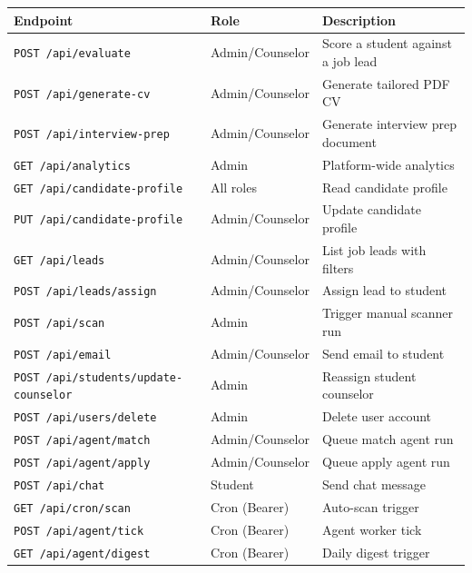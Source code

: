 \documentclass[11pt, a4paper]{article}
\newcommand{\api}[1]{\texttt{\textcolor{accent}{#1}}}
\begin{document}
\begin{longtable}{p{5.5cm}lp{6cm}}
  \toprule
  \textbf{Endpoint} & \textbf{Role} & \textbf{Description} \\
  \midrule
  \endhead
  \api{POST /api/evaluate}                & Admin/Counselor & Score a student against a job lead \\
  \api{POST /api/generate-cv}             & Admin/Counselor & Generate tailored PDF CV \\
  \api{POST /api/interview-prep}          & Admin/Counselor & Generate interview prep document \\
  \api{GET  /api/analytics}               & Admin           & Platform-wide analytics \\
  \api{GET  /api/candidate-profile}       & All roles       & Read candidate profile \\
  \api{PUT  /api/candidate-profile}       & Admin/Counselor & Update candidate profile \\
  \api{GET  /api/leads}                   & Admin/Counselor & List job leads with filters \\
  \api{POST /api/leads/assign}            & Admin/Counselor & Assign lead to student \\
  \api{POST /api/scan}                    & Admin           & Trigger manual scanner run \\
  \api{POST /api/email}                   & Admin/Counselor & Send email to student \\
  \api{POST /api/students/update-counselor} & Admin         & Reassign student counselor \\
  \api{POST /api/users/delete}            & Admin           & Delete user account \\
  \api{POST /api/agent/match}             & Admin/Counselor & Queue match agent run \\
  \api{POST /api/agent/apply}             & Admin/Counselor & Queue apply agent run \\
  \api{POST /api/chat}                    & Student         & Send chat message \\
  \api{GET  /api/cron/scan}               & Cron (Bearer)   & Auto-scan trigger \\
  \api{POST /api/agent/tick}              & Cron (Bearer)   & Agent worker tick \\
  \api{GET  /api/agent/digest}            & Cron (Bearer)   & Daily digest trigger \\
  \bottomrule
\end{longtable}
\end{document}
